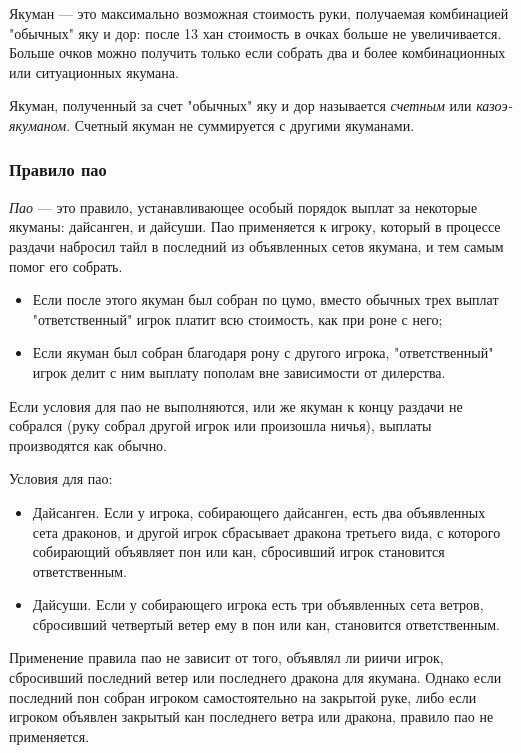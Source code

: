 Якуман --- это максимально возможная стоимость руки, получаемая комбинацией "обычных" яку и дор: после 13 хан стоимость в очках больше не увеличивается. Больше очков можно получить только если собрать два и более комбинационных или ситуационных якумана.

Якуман, полученный за счет "обычных" яку и дор называется \textit{счетным} или \textit{казоэ-якуманом}. Счетный якуман не суммируется с другими якуманами.

\subsubsection{Правило пао}

\textit{Пао} --- это правило, устанавливающее особый порядок выплат за некоторые якуманы: дайсанген, и дайсуши. 
Пао применяется к игроку, который в процессе раздачи набросил тайл в последний из объявленных сетов якумана, и тем самым помог его собрать.
\begin{itemize}
	\item Если после этого якуман был собран по цумо, вместо обычных трех выплат "ответственный" игрок платит всю стоимость, как при роне с него;
	\item Если якуман был собран благодаря рону с другого игрока, "ответственный" игрок делит с ним выплату пополам вне зависимости от дилерства.
\end{itemize}

Если условия для пао не выполняются, или же якуман к концу раздачи не собрался (руку собрал другой игрок или произошла ничья), выплаты производятся как обычно.

Условия для пао:
\begin{itemize}
	\item Дайсанген. Если у игрока, собирающего дайсанген, есть два объявленных сета драконов, и другой игрок сбрасывает дракона третьего вида, с которого собирающий объявляет пон или кан, сбросивший игрок становится ответственным.
	\item Дайсуши. Если у собирающего игрока есть три объявленных сета ветров, сбросивший четвертый ветер ему в пон или кан, становится ответственным.
\end{itemize}

Применение правила пао не зависит от того, объявлял ли риичи игрок, сбросивший последний ветер или последнего дракона для якумана. Однако если последний пон собран игроком самостоятельно на закрытой руке, либо если игроком объявлен закрытый кан последнего ветра или дракона, правило пао не применяется.

